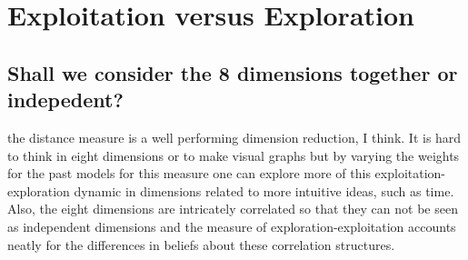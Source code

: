 \section{Exploitation versus Exploration}



\subsection{Shall we consider the 8 dimensions together or indepedent?}

the distance measure is a well performing dimension reduction, I think.  It is hard to think in eight dimensions or to make visual graphs but by varying the weights for the past models for this measure one can explore more of this exploitation-exploration dynamic in dimensions related to more intuitive ideas, such as time.  Also, the eight dimensions are intricately correlated so that they can not be seen as independent dimensions and the measure of exploration-exploitation accounts neatly for the differences in beliefs about these correlation structures. 